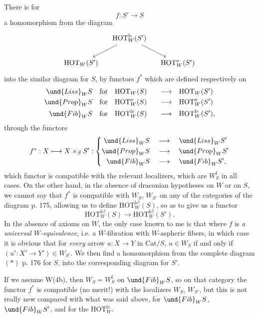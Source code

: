 There is for
\[
f : S' \longrightarrow S
\]
a homomorphism from the diagram
\[
\begin{tikzcd}[column sep=small]
& \mathrm{HOT}^{\mathrm{lc}}_W(S') \arrow[dl] \arrow[dr] & \\
\mathrm{HOT}_W(S') & & \mathrm{HOT}^{o}_W(S')
\end{tikzcd}
\]
into the similar diagram for $S$, by functors $f^*$ which are defined respectively on
\[
\begin{aligned}
\und{Liss}_W S &\quad \text{for}\quad \mathrm{HOT}_W(S) & \quad\longrightarrow\quad & \mathrm{HOT}_W(S')\\
\und{Prop}_W S &\quad \text{for}\quad \mathrm{HOT}^{o}_W(S) & \quad\longrightarrow\quad & \mathrm{HOT}^{o}_W(S')\\
\und{Fib}_W S &\quad \text{for}\quad \mathrm{HOT}^{\mathrm{lc}}_W(S) & \quad\longrightarrow\quad & \mathrm{HOT}^{\mathrm{lc}}_W(S'),
\end{aligned}
\]
through the functors %
\[
f^* : X \longmapsto X \times_S S' : \left\{
\begin{aligned}
\und{Liss}_W S &\quad\longrightarrow\quad \und{Liss}_W S'\\
\und{Prop}_W S &\quad\longrightarrow\quad \und{Prop}_W S'\\
\und{Fib}_W S &\quad\longrightarrow\quad \und{Fib}_W S',
\end{aligned}
\right.
\]
which functor is compatible with the relevant localizers, which are $W_S^{\mathrm{f}}$ in all cases. On the other hand, in the absence of draconian hypotheses on $W$ or on $S$, we cannot say that $f^*$ is compatible with $W_S$, $W_{S'}$ on any of the categories of the diagram p. 175, allowing us to define $\mathrm{HOT}^{\mathrm{lc!}}_W(S)$, so as to give us a functor %
\[
\mathrm{HOT}^{\mathrm{lc!}}_W(S) \longrightarrow \mathrm{HOT}^{\mathrm{lc!}}_W(S').
\]
In the absence of axioms on $W$, the only case known to me is that where $f$ is \textit{a universal $W$-equivalence,} i.e. a $W$-fibration with $W$-aspheric fibers, in which case it is obvious that for \textit{every} arrow $u : X \longrightarrow Y$ in $\mathrm{Cat}/S$, $u \in W_S$ if and only if $(u' : X' \longrightarrow Y') \in W_{S'}$. We then find a homomorphism from the complete diagram $(*)$ p. 176 for $S$, into the corresponding diagram for $S'$.

If we assume W(4b), then $W_S = W_S^{\mathrm{f}}$ on $\und{Fib}_W S$, so on that category the functor $f^*$ is compatible (no merit!) with the localizers $W_S$, $W_{S'}$, but this is not really new
compared with what was said above, for $\und{Fib}_W S$, $\und{Fib}_W S'$, and for the $\mathrm{HOT}^{\mathrm{lc}}_W$.


